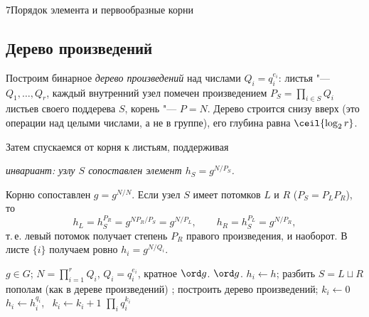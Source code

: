 \begin{lecture}{7}{Порядок элемента и первообразные корни}
\subsection{Дерево произведений}

Построим бинарное \emph{дерево произведений} над числами $Q_i = q_i^{e_i}$: листья "---
$Q_1, \dots, Q_r$, каждый внутренний узел помечен произведением $P_S = \prod_{i \in S} Q_i$
листьев своего поддерева $S$, корень "--- $P = N$. Дерево строится снизу вверх (это операции
над целыми числами, а не в группе), его глубина равна $\ceil{\log_2 r}$.

Затем спускаемся от корня к листьям, поддерживая

\begin{center}
\emph{инвариант: узлу $S$ сопоставлен элемент $h_S = g^{N/P_S}$.}
\end{center}

Корню сопоставлен $g = g^{N/N}$. Если узел $S$ имеет потомков $L$ и $R$ ($P_S = P_L P_R$), то
\[
  h_L = h_S^{P_R} = g^{N P_R / P_S} = g^{N / P_L}, \qquad
  h_R = h_S^{P_L} = g^{N / P_R},
\]
т.\,е. левый потомок получает степень $P_R$ правого произведения, и наоборот. В листе $\{i\}$
получаем ровно $h_i = g^{N/Q_i}$.

\begin{algorithm}\label{l7:alg-tree}
\begin{algorithmic}[1]
\Require $g \in G$; $N = \prod_{i=1}^r Q_i$, $Q_i = q_i^{e_i}$, кратное $\ord g$.
\Ensure $\ord g$.
 
   \State $h_i \gets h$; \Return \EndIf
  \State разбить $S = L \sqcup R$ пополам (как в дереве произведений)
  \State {}; \quad {}
\EndFunction
\State построить дерево произведений; 
  \State $k_i \gets 0$
   \State $h_i \gets h_i^{q_i}$, \ $k_i \gets k_i + 1$ \EndWhile
\EndFor
\State \Return $\prod_i q_i^{k_i}$
\end{algorithmic}
\end{algorithm}


\end{lecture}
